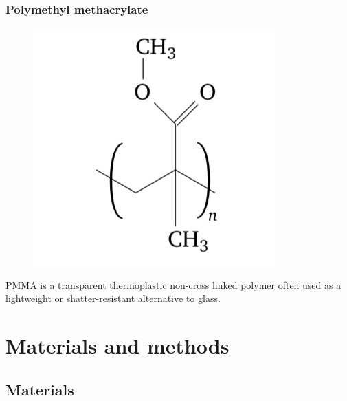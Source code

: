 \documentclass[a4paper, 11pt]{article}
\begin{document}
\subsubsection{Polymethyl methacrylate}

\begin{figure}[h!]
	\centering
	{\includegraphics[scale=0.25]{pmma_chem}}
	\captionsetup{justification=centering}
	\label{fig:PE}
\end{figure}
PMMA  is a transparent thermoplastic non-cross linked polymer often used as a lightweight or shatter-resistant alternative to glass.

\newpage 

\section{Materials and methods}

\subsection{Materials}
\end{document}
